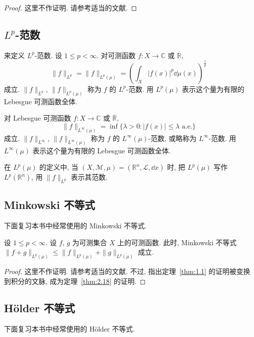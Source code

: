\begin{proof}
这里不作证明. 请参考适当的文献.
\end{proof}

\subsection*{$L^{p}$-范数}

来定义 $L^{p}$-范数. 设 $1 \leq p < \infty$. 对可测函数 $f: X \to \mathbb{C}$ 或 $\overline{\mathbb{R}}$,
\[
\|f\|_{L^{p}} = \|f\|_{L^{p}(\mu)} = \left(\int_{X}|f(x)|^{p}\dd\mu(x)\right)^{\frac{1}{p}}
\]
成立. $\|f\|_{L^{p}}$, $\|f\|_{L^{p}(\mu)}$ 称为 $f$ 的 $L^{p}$-范数. 用 $L^{p}(\mu)$ 表示这个量为有限的 Lebesgue 可测函数全体.

对 Lebesgue 可测函数 $f: X \to \mathbb{C}$ 或 $\overline{\mathbb{R}}$,
\[
\|f\|_{L^{\infty}(\mu)} = \inf\{\lambda > 0 : |f(x)| \leq \lambda \text{ a.e.}\}
\]
成立. $\|f\|_{L^{\infty}}$, $\|f\|_{L^{\infty}(\mu)}$ 称为 $f$ 的 $L^{\infty}(\mu)$-范数, 或略称为 $L^{\infty}$-范数. 用 $L^{\infty}(\mu)$ 表示这个量为有限的 Lebesgue 可测函数全体.

在 $L^{p}(\mu)$ 的定义中, 当 $(X, \mathcal{M}, \mu) = (\mathbb{R}^{n}, \mathcal{L}, \dd x)$ 时, 把 $L^{p}(\mu)$ 写作 $L^{p}(\mathbb{R}^{n})$, 用 $\|f\|_{L^{p}}$ 表示其范数.

\subsection*{Minkowski 不等式}

下面复习本书中经常使用的 Minkowski 不等式.

\begin{theorem}\label{thm:2.18}
设 $1 \leq p < \infty$. 设 $f$, $g$ 为可测集合 $X$ 上的可测函数. 此时, Minkowski 不等式 $\|f + g\|_{L^{p}(\mu)} \leq \|f\|_{L^{p}(\mu)} + \|g\|_{L^{p}(\mu)}$ 成立.
\end{theorem}

\begin{proof}
这里不作证明. 请参考适当的文献. 不过, 指出定理~\ref{thm:1.1} 的证明被变换到积分的文脉, 成为定理~\ref{thm:2.18} 的证明.
\end{proof}

\subsection*{Hölder 不等式}

下面复习本书中经常使用的 Hölder 不等式.

